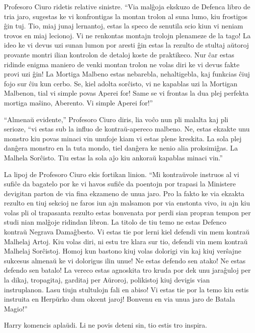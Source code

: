 Profesoro Ciuro ridetis relative sinistre. ``Via malĝoja ekskuzo de
Defenca libro de tria jaro, sugestas ke vi konfrontigas la montan
trolon al suna lumo, kiu frostigos ĝin tuj. Tio, miaj junaj lernantoj,
estas la speco de senutila scio kiun vi neniam trovos en miaj
lecionoj. Vi ne renkontas montajn trolojn plenameze de la tago! La
ideo ke vi devus uzi sunan lumon por aresti ĝin estas la rezulto de
stultaj aŭtoroj provante montri ilian kontrolon de detaloj koste de
praktikeco. Nur ĉar estas ridinde enigma maniero de venki montan
trolon ne volas diri ke vi devus fakte provi uzi ĝin! La Mortiga
Malbeno estas nebarebla, nehaltigebla, kaj funkcias ĉiuj fojo sur ĉiu
kun cerbo. Se, kiel adolta sorĉisto, vi ne kapablas uzi la Mortigan
Malbenon, tial vi simple povas Aperei for! Same se vi frontas la dua
plej perfekta mortiga maŝino, Aberento. Vi simple Aperei for!''

``Almenaŭ evidente,'' Profesoro Ciuro diris, lia voĉo nun pli malalta kaj
pli serioze, ``vi estas sub la influo de kontraŭ-apereco malbeno. Ne,
estas ekzakte unu monstro kiu povas minaci vin unufoje kiam vi estas
plene kreskita. La sola plej danĝera monstro en la tuta mondo, tiel
danĝera ke nenio alia proksimiĝas. La Malhela Sorĉisto. Tiu estas la
sola aĵo kiu ankoraŭ kapablas minaci vin.''

La lipoj de Profesoro Ciuro ekis fortikan linion. ``Mi kontraŭvole
instruos al vi sufiĉe da bagatelo por ke vi havos sufiĉe da poentojn
por trapasi la Ministere devigitan parton de via fina ekzameno de unua
jaro. Pro la fakto ke via ekzakta rezulto en tiuj sekcioj ne faros iun
ajn malsamon por via enstonta vivo, iu ajn kiu volas pli ol trapasanta
rezulto estas bonvenata por perdi sian propran tempon per studi nian
malĝoje ridindan libron. La titolo de tiu temo ne estas Defenco
kontraŭ Negrava Damaĝbesto. Vi estas tie por lerni kiel defendi vin
mem kontraŭ Malhelaj Artoj. Kiu volas diri, ni estu tre klara sur tio,
defendi vin mem kontraŭ Malhelaj Sorĉistoj. Homoj kun bastono kiuj
volas dolorigi vin kaj kiuj verŝajne sukcesus almenaŭ ke vi dolorigus
ilin unue! Ne estas defendo sen atako! Ne estas defendo sen batalo! La
vereco estas agnoskita tro kruda por dek unu jaraĝuloj per la dikaj,
tropagitaj, garditaj per Aŭroroj, polikistoj kiuj devigis vian
instruplanon. Lasu tiujn stultulojn fali en abiso! Vi estas tie por la
temo kiu estis instruita en Herpŭrko dum okcent jaroj! Bonvenu en via
unua jaro de Batala Magio!''

Harry komencis aplaŭdi. Li ne povis deteni sin, tio estis tro inspira.

